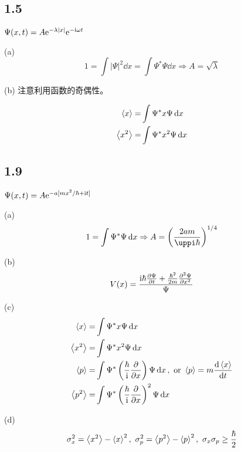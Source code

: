 \subsection{1.5}

\begin{framed}
$\Psi (x, t) = A \mathrm{e}^{- \lambda |x|} \mathrm{e}^{- \mathrm{i} \omega t}$

(a)
\[
1 = \int |\Psi|^2 \dd{x} = \int \Psi^* \Psi \dd{x} \Rightarrow A = \sqrt{\lambda}
\]

(b)
注意利用函数的奇偶性。

\begin{align*}
    \expval{x} = & \int \Psi^* x \Psi \dd{x}\\
    \expval{x^2} = & \int \Psi^* x^2 \Psi \dd{x}
\end{align*}
\end{framed}

\subsection{1.9}

\begin{framed}
$\Psi(x, t) = A \mathrm{e}^{- a [m x^2 / \hbar + \mathrm{i} t]}$

(a)
\[
1 = \int \Psi^* \Psi \dd{x} \Rightarrow A = \qty(\frac{2 a m}{\uppi \hbar})^{1/4}
\]

(b)
\[
V(x) = \frac{\mathrm{i} \hbar \pdv{\Psi}{t} + \frac{\hbar^2}{2 m} \pdv[2]{\Psi}{x}}{\Psi}
\]

(c)
\begin{align*}
    \expval{x} = & \int \Psi^* x \Psi \dd{x}\\
    \expval{x^2} = & \int \Psi^* x^2 \Psi \dd{x}\\
    \expval{p} = & \int \Psi^* \left(\frac{\hbar}{\mathrm{i}} \pdv{}{x}\right) \Psi \dd{x},\text{ or }\expval{p} = m \dv{\expval{x}}{t}\\
    \expval{p^2} = & \int \Psi^* \left(\frac{\hbar}{\mathrm{i}} \pdv{}{x}\right)^2 \Psi \dd{x}\\
\end{align*}

(d)
\[
\sigma_x^2 = \expval{x^2} - \expval{x}^2,\ \sigma_p^2 = \expval{p^2} - \expval{p}^2,\ \sigma_x \sigma_p \geq \frac{\hbar}{2}
\]
\end{framed}

